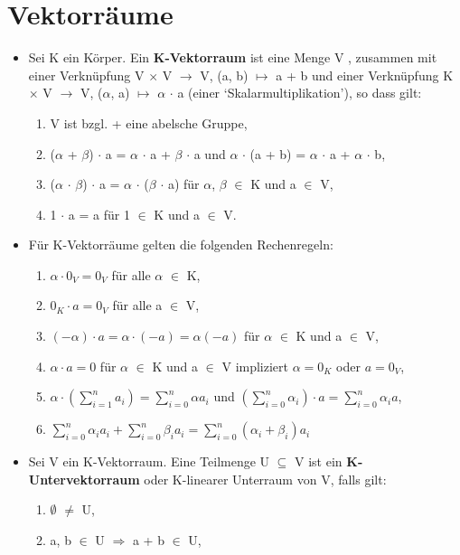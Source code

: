 \section{Vektorräume}
\begin{itemize}
\item Sei K ein Körper. Ein \textbf{K-Vektorraum} ist eine Menge V , zusammen mit einer Verknüpfung V $\times$ V $\to$ V, (a, b) $\mapsto$ a + b und einer Verknüpfung K $\times$ V $\to$ V, ($\alpha$, a) $\mapsto$ $\alpha$ $\cdot$ a (einer ‘Skalarmultiplikation’), so dass gilt:
\begin{enumerate}
\item V ist bzgl. + eine abelsche Gruppe,
\item ($\alpha$ + $\beta$) $\cdot$ a = $\alpha$ $\cdot$ a + $\beta$ $\cdot$ a und $\alpha$ $\cdot$ (a + b) = $\alpha$ $\cdot$ a + $\alpha$ $\cdot$ b,
\item ($\alpha$ $\cdot$ $\beta$) $\cdot$ a = $\alpha$ $\cdot$ ($\beta$ $\cdot$ a) für $\alpha$, $\beta$ $\in$ K und a $\in$ V,
\item 1 $\cdot$ a = a für 1 $\in$ K und a $\in$ V.
\end{enumerate}
\item Für K-Vektorräume gelten die folgenden Rechenregeln:
\begin{enumerate}
\item $\alpha \cdot 0_V = 0_V$ für alle $\alpha$ $\in$ K,
\item $0_K \cdot a = 0_V$  für alle a $\in$ V,
\item $(-\alpha) \cdot a = \alpha \cdot (-a) = \alpha(-a)$ für $\alpha$ $\in$ K und a $\in$ V,
\item $\alpha \cdot a = 0$ für $\alpha$ $\in$ K und a $\in$ V impliziert $\alpha = 0_K$ oder $a = 0_V$,
\item $\alpha \cdot (\sum\nolimits_{i=1}^{n} a_i) = \sum\nolimits_{i=0}^{n} \alpha a_i$ und $(\sum\nolimits_{i=0}^{n}\alpha_i) \cdot a = \sum\nolimits_{i=0}^{n} \alpha_i a$,
\item $\sum\nolimits_{i=0}^{n} \alpha_i a_i + \sum\nolimits_{i=0}^{n} \beta_i a_i = \sum\nolimits_{i=0}^{n} (\alpha_i + \beta_i) a_i$
\end{enumerate}
\item Sei V ein K-Vektorraum. Eine Teilmenge U $\subseteq$ V ist ein \textbf{K-Untervektorraum} oder K-linearer Unterraum von V, falls gilt:
\begin{enumerate}
\item $\emptyset$ $\neq$ U,
\item a, b $\in$ U $\Rightarrow$ a + b $\in$ U,

\end{enumerate}
\end{itemize}

